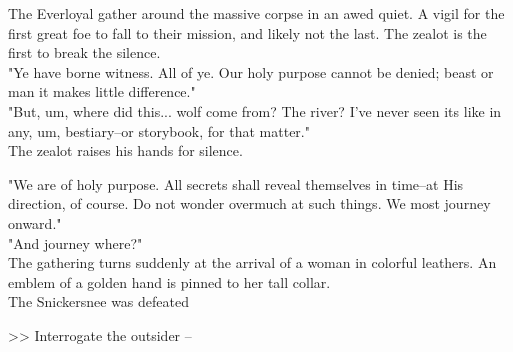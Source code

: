 The Everloyal gather around the massive corpse in an awed quiet. A vigil for the first great foe to fall to their mission, and likely not the last. The zealot is the first to break the silence.\\

"Ye have borne witness. All of ye. Our holy purpose cannot be denied; beast or man it makes little difference."\\

"But, um, where did this... wolf come from? The river? I've never seen its like in any, um, bestiary--or storybook, for that matter."\\

The zealot raises his hands for silence.

"We are of holy purpose. All secrets shall reveal themselves in time--at His direction, of course. Do not wonder overmuch at such things. We most journey onward."\\

"And journey where?"\\

The gathering turns suddenly at the arrival of a woman in colorful leathers. An emblem of a golden hand is pinned to her tall collar.\\

 The Snickersnee was defeated

>> Interrogate the outsider -- 